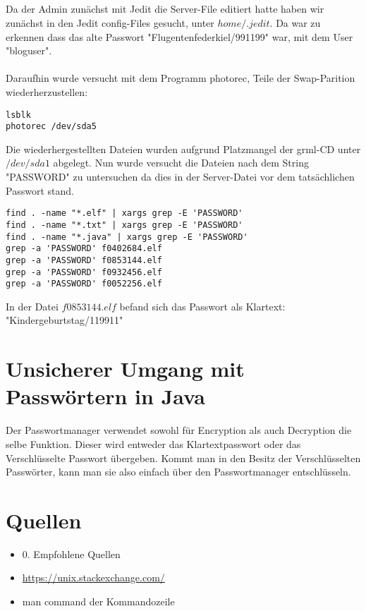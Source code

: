 \documentclass[11pt]{article}
\theoremstyle{plain}
\begin{document}
\subsection{}
Da der Admin zunächst mit Jedit die Server-File editiert hatte haben wir zunächst in den Jedit config-Files gesucht, unter $home/.jedit$. Da war zu erkennen dass das alte Passwort "Flugentenfederkiel/991199" war, mit dem User "bloguser". \\ \\ Daraufhin wurde versucht mit dem Programm photorec, Teile der Swap-Parition wiederherzustellen:
\begin{lstlisting}
lsblk
photorec /dev/sda5
\end{lstlisting}
Die wiederhergestellten Dateien wurden aufgrund Platzmangel der grml-CD unter $/dev/sda1$ abgelegt. Nun wurde versucht die Dateien nach dem String "PASSWORD" zu untersuchen da dies in der Server-Datei vor dem tatsächlichen Passwort stand.
\newpage
\begin{lstlisting}
find . -name "*.elf" | xargs grep -E 'PASSWORD'
find . -name "*.txt" | xargs grep -E 'PASSWORD'
find . -name "*.java" | xargs grep -E 'PASSWORD'
grep -a 'PASSWORD' f0402684.elf
grep -a 'PASSWORD' f0853144.elf
grep -a 'PASSWORD' f0932456.elf
grep -a 'PASSWORD' f0052256.elf
\end{lstlisting}
In der Datei $f0853144.elf$ befand sich das Passwort als Klartext: "Kindergeburtstag/119911"
\section{Unsicherer Umgang mit Passwörtern in Java}
Der Passwortmanager verwendet sowohl für Encryption als auch Decryption die selbe Funktion. Dieser wird entweder das Klartextpasswort oder das Verschlüsselte Passwort übergeben. Kommt man in den Besitz der Verschlüsselten Passwörter, kann man sie also einfach über den Passwortmanager entschlüsseln.
\section{Quellen}
\begin{itemize}
\item 0. Empfohlene Quellen
\item \url{https://unix.stackexchange.com/}
\item man command der Kommandozeile
\end{itemize}
\end{document}
